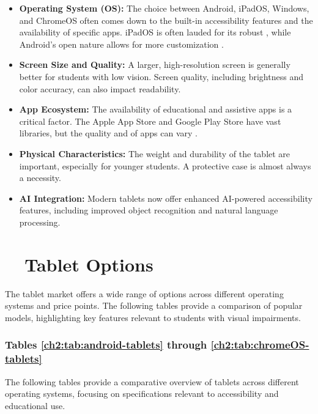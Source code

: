 \begin{itemize}
	\item \textbf{Operating System (OS):} The choice between Android, iPadOS, Windows, and ChromeOS often comes down to the built-in accessibility features and the availability of specific apps. iPadOS is often lauded for its robust   \supercite{AppleVoiceOver, AFBiOS}, while Android's open nature allows for more customization \supercite{AndroidAccessibility, GoogleTalkBack, SamsungAccessibility}.
	\item \textbf{Screen Size and Quality:} A larger, high-resolution screen is generally better for students with low vision. Screen quality, including brightness and color accuracy, can also impact readability.\supercite{AFBiOS, AAOTechnologyTools, BOIAScreenMagnifiers}
	\item \textbf{App Ecosystem:} The availability of educational and assistive apps is a critical factor. The Apple App Store and Google Play Store have vast libraries, but the quality and  of apps can vary \supercite{AAOApps, Bookshare, VoiceDreamReader}.
	\item \textbf{Physical Characteristics:} The weight and durability of the tablet are important, especially for younger students. A protective case is almost always a necessity.\supercite{Day2021, Holbrook2006}
	\item \textbf{AI Integration:} Modern tablets now offer enhanced AI-powered accessibility features, including improved object recognition and natural language processing.\supercite{HIMSReleaseNotes, Android16Release, msseeingai, envision}
\end{itemize}

\section{~~Tablet Options}\label{ch2:sec:tablet-options}

The tablet market offers a wide range of options across different operating systems and price points. The following tables provide a comparison of popular models, highlighting key features relevant to students with visual impairments.

\subsubsection{Tables \ref{ch2:tab:android-tablets} through \ref{ch2:tab:chromeOS-tablets}}
The following tables provide a comparative overview of tablets across different operating systems, focusing on specifications relevant to \gls{accessibility} and educational use.

